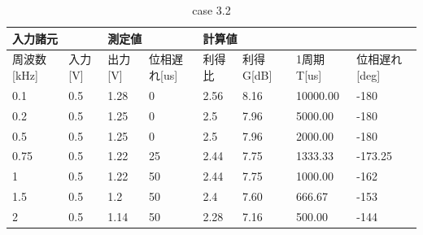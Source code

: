\documentclass[dvipdfmx,titlepage,a4j]{jsarticle}  %
\begin{document}
\begin{table}[H]
  \centering
  \caption{case 3.2}
  \begin{tabular}{ll|ll|llll}
  \hline
  \multicolumn{2}{l|}{入力諸元}                        & \multicolumn{2}{l|}{測定値}                           & \multicolumn{4}{l}{計算値}                                                                                                                          \\ \hline
  \multicolumn{1}{l|}{周波数{[}kHz{]}} & 入力{[}V{]} & \multicolumn{1}{l|}{出力{[}V{]}} & 位相遅れ{[}us{]} & \multicolumn{1}{l|}{利得比} & \multicolumn{1}{l|}{利得G{[}dB{]}} & \multicolumn{1}{l|}{1周期T{[}us{]}} & \multicolumn{1}{l}{位相遅れ{[}deg{]}} \\ \hline \hline
  \multicolumn{1}{l|}{0.1}           & 0.5         & \multicolumn{1}{l|}{1.28}        & 0               & \multicolumn{1}{l|}{2.56}    & \multicolumn{1}{l|}{8.16}            & \multicolumn{1}{l|}{10000.00}        & -180                                \\ \hline
  \multicolumn{1}{l|}{0.2}           & 0.5         & \multicolumn{1}{l|}{1.25}        & 0               & \multicolumn{1}{l|}{2.5}     & \multicolumn{1}{l|}{7.96}            & \multicolumn{1}{l|}{5000.00}         & -180                                \\ \hline
  \multicolumn{1}{l|}{0.5}           & 0.5         & \multicolumn{1}{l|}{1.25}        & 0               & \multicolumn{1}{l|}{2.5}     & \multicolumn{1}{l|}{7.96}            & \multicolumn{1}{l|}{2000.00}         & -180                                \\ \hline
  \multicolumn{1}{l|}{0.75}          & 0.5         & \multicolumn{1}{l|}{1.22}        & 25              & \multicolumn{1}{l|}{2.44}    & \multicolumn{1}{l|}{7.75}            & \multicolumn{1}{l|}{1333.33}         & -173.25                             \\ \hline
  \multicolumn{1}{l|}{1}             & 0.5         & \multicolumn{1}{l|}{1.22}        & 50              & \multicolumn{1}{l|}{2.44}    & \multicolumn{1}{l|}{7.75}            & \multicolumn{1}{l|}{1000.00}         & -162                                \\ \hline
  \multicolumn{1}{l|}{1.5}           & 0.5         & \multicolumn{1}{l|}{1.2}         & 50              & \multicolumn{1}{l|}{2.4}     & \multicolumn{1}{l|}{7.60}            & \multicolumn{1}{l|}{666.67}          & -153                                \\ \hline
  \multicolumn{1}{l|}{2}             & 0.5         & \multicolumn{1}{l|}{1.14}        & 50              & \multicolumn{1}{l|}{2.28}    & \multicolumn{1}{l|}{7.16}            & \multicolumn{1}{l|}{500.00}          & -144                                \\ \hline

\end{tabular}
\end{table}
\end{document}
